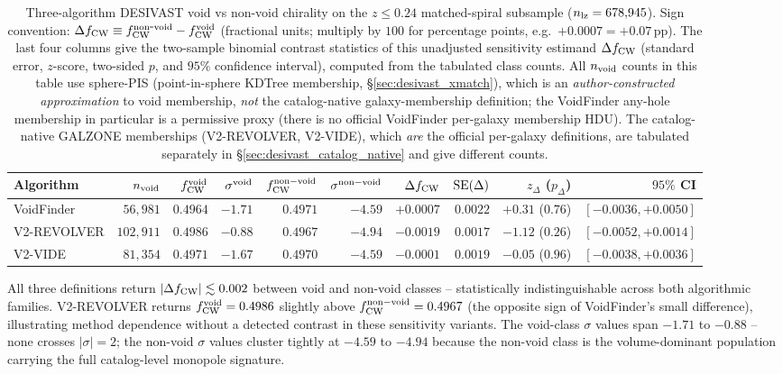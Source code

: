 \documentclass[aps,prd,twocolumn,superscriptaddress,showpacs,preprintnumbers,nofootinbib,longbibliography,floatfix]{revtex4-2}
\begin{document}
\begin{table}[ht]
\caption{Three-algorithm DESIVAST void vs non-void chirality on the
$z \leq 0.24$ matched-spiral subsample ($n_{\rm lz} = 678{,}945$).
Sign convention: $\Delta f_{\rm CW} \equiv f_{\rm CW}^{\rm non\mbox{-}void}
- f_{\rm CW}^{\rm void}$ (fractional units; multiply by $100$ for
percentage points, e.g.\ $+0.0007 = +0.07$\,pp). The last four columns give the two-sample
binomial contrast statistics of this unadjusted sensitivity estimand
$\Delta f_{\rm CW}$ (standard error, $z$-score, two-sided $p$, and
$95\%$ confidence interval), computed from the tabulated class counts.
All $n_{\rm void}$ counts in this table use sphere-PIS
(point-in-sphere KDTree membership, \S\ref{sec:desivast_xmatch}), which is
an \emph{author-constructed approximation} to void membership, \emph{not}
the catalog-native galaxy-membership definition; the VoidFinder any-hole
membership in particular is a permissive proxy (there is no official
VoidFinder per-galaxy membership HDU). The catalog-native GALZONE
memberships (V2-REVOLVER, V2-VIDE), which \emph{are} the official
per-galaxy definitions, are tabulated separately in
\S\ref{sec:desivast_catalog_native} and give different counts.}
\label{tab:desivast_three_algo}
\begin{ruledtabular}
\begin{tabular}{lrrrrrrrrr}
Algorithm & $n_{\rm void}$ & $f_{\rm CW}^{\rm void}$ &
$\sigma^{\rm void}$ & $f_{\rm CW}^{\rm non-void}$ &
$\sigma^{\rm non-void}$ & $\Delta f_{\rm CW}$ & ${\rm SE}(\Delta)$ &
$z_\Delta$ ($p_\Delta$) & $95\%$ CI \\
\hline
VoidFinder   & $56{,}981$  & $0.4964$ & $-1.71$ & $0.4971$ & $-4.59$ & $+0.0007$ & $0.0022$ & $+0.31$ ($0.76$) & $[-0.0036, +0.0050]$ \\
V2-REVOLVER  & $102{,}911$ & $0.4986$ & $-0.88$ & $0.4967$ & $-4.94$ & $-0.0019$ & $0.0017$ & $-1.12$ ($0.26$) & $[-0.0052, +0.0014]$ \\
V2-VIDE      & $81{,}354$  & $0.4971$ & $-1.67$ & $0.4970$ & $-4.59$ & $-0.0001$ & $0.0019$ & $-0.05$ ($0.96$) & $[-0.0038, +0.0036]$ \\
\end{tabular}
\end{ruledtabular}
\end{table}

All three definitions return $|\Delta f_{\rm CW}| \lesssim 0.002$ between
void and non-void classes -- statistically indistinguishable across both
algorithmic families. V2-REVOLVER returns
$f_{\rm CW}^{\rm void} = 0.4986$ slightly above $f_{\rm CW}^{\rm
non-void} = 0.4967$ (the opposite sign of VoidFinder's small
difference), illustrating method dependence without a detected contrast
in these sensitivity variants. The void-class $\sigma$ values span $-1.71$ to $-0.88$ --
none crosses $|\sigma| = 2$; the non-void $\sigma$ values cluster
tightly at $-4.59$ to $-4.94$ because the non-void class is the
volume-dominant population carrying the full catalog-level monopole
signature.
\end{document}
